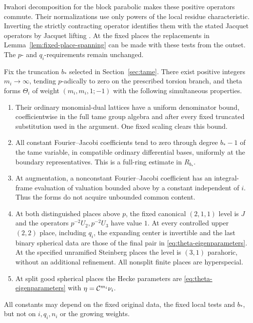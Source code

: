 Iwahori decomposition for the block parabolic makes these positive
operators commute.  Their normalizations use only powers of the local
residue characteristic.  Inverting the strictly contracting operator
identifies them with the stated Jacquet operators by Jacquet lifting
\cite{Casselman1995}.  At the fixed places the replacements in
Lemma~\ref{lem:fixed-place-spanning} can be made with these tests from
the outset.  The $p$- and $q_i$-requirements remain unchanged.

\begin{proposition}\label{prop:bounded-content}
 Fix the truncation $b_*$ selected in Section~\ref{sec:tame}.  There
 exist positive integers $m_i\to\infty$, tending $p$-adically to zero
 on the prescribed torsion branch, and theta forms $\Theta_i$ of
 weight $(m_i,m_i,1;-1)$ with the following simultaneous properties.
 \begin{enumerate}[label=\textup{(\roman*)}]
 \item Their ordinary monomial-dual lattices have a uniform denominator
       bound, coefficientwise in the full tame group algebra and after
       every fixed truncated substitution used in the argument.  One
       fixed scaling clears this bound.
 \item All constant Fourier--Jacobi coefficients tend to zero through
       degree $b_*-1$ of the tame variable, in compatible ordinary
       differential bases, uniformly at the boundary representatives.
       This is a full-ring estimate in $R_{b_*}$.
 \item At augmentation, a nonconstant Fourier--Jacobi coefficient has
       an integral-frame evaluation of valuation bounded above by a
       constant independent of $i$.  Thus the forms do not acquire
       unbounded common content.
 \item At both distinguished places above $p$, the fixed canonical
       $(2,1,1)$ level is $J$ and the operators $p^{-2}U_2,p^{-2}U_3$
       have value $1$.  At every controlled upper $(2,2)$ place,
       including $q_i$, the expanding center is invertible and the
       last binary spherical data are those of the final pair in
       \eqref{eq:theta-eigenparameters}.  At the specified unramified
       Steinberg places the level is $(3,1)$ parahoric, without an
       additional refinement.  All nonsplit finite places are
       hyperspecial.
 \item At split good spherical places the Hecke parameters are
       \eqref{eq:theta-eigenparameters} with
       $\eta=\mathcal C^{m_i}\nu_i$.
 \end{enumerate}
 All constants may depend on the fixed original data, the fixed local
 tests and $b_*$, but not on $i,q_i,n_i$ or the growing weights.
\end{proposition}
